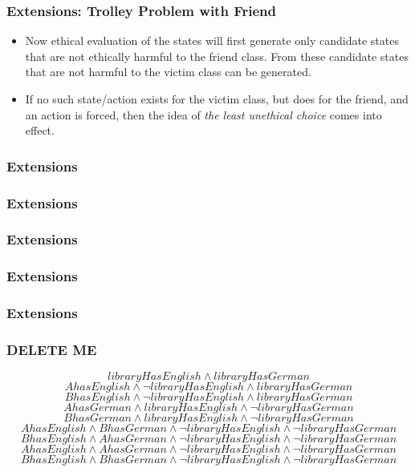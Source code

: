\documentclass{beamer}
\begin{document}
 
 \begin{frame}
\frametitle{Extensions: Trolley Problem with Friend}
\begin{itemize}
\item Now ethical evaluation of the states will first generate only candidate states that are not ethically harmful to the friend class. From these candidate states that are not harmful to the victim class can be generated.
\item If no such state/action exists for the victim class, but does for the friend, and an action is forced, then the idea of \textit{the least unethical choice} comes into effect.
\end{itemize}
 \end{frame}
 
 
 \begin{frame}
\frametitle{Extensions}
 \end{frame}
  
  
  \begin{frame}
\frametitle{Extensions}
 \end{frame}
 
 
 \begin{frame}
\frametitle{Extensions}
 \end{frame}
 
 
 \begin{frame}
\frametitle{Extensions}
 \end{frame}
 
 
 \begin{frame}
\frametitle{Extensions}
 \end{frame}
 
 
 
 
 
 
 
 
 
 
 
 
 
 
 
 
\begin{frame}
\frametitle{DELETE ME}

\[
libraryHasEnglish \land libraryHasGerman
\]
\[
AhasEnglish \land \lnot libraryHasEnglish \land libraryHasGerman
\]
\[
BhasEnglish \land \lnot libraryHasEnglish \land libraryHasGerman
\]
\[
AhasGerman \land libraryHasEnglish \land \lnot libraryHasGerman
\]
\[
BhasGerman \land libraryHasEnglish \land \lnot libraryHasGerman
\]
\[
AhasEnglish \land BhasGerman \land \lnot libraryHasEnglish \land \lnot libraryHasGerman
\]
\[
BhasEnglish \land AhasGerman \land \lnot libraryHasEnglish \land \lnot libraryHasGerman
\]
\[
AhasEnglish \land AhasGerman \land \lnot libraryHasEnglish \land \lnot libraryHasGerman
\]
\[
BhasEnglish \land BhasGerman \land \lnot libraryHasEnglish \land \lnot libraryHasGerman
\]

 \end{frame}
\end{document}
